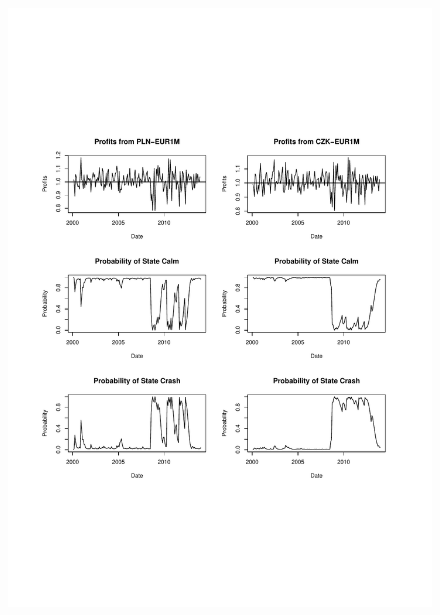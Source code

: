 \documentclass[12pt, a4paper, oneside]{article} %
\begin{document}
\begin{figure}[h!]
\centering
\includegraphics[scale = .80]{../Figures/2RegProb/PLNCZKEUR.pdf}
\end{figure}
\end{document}
